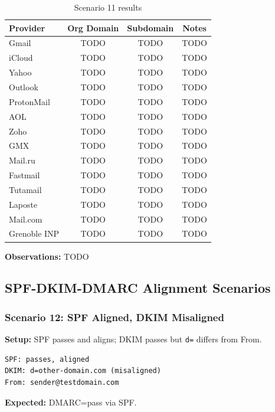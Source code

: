 \documentclass[11pt,a4paper]{article}
\begin{document}
\begin{table}[h]
\centering
\small
\begin{tabular}{lccc}
\toprule
\textbf{Provider} & \textbf{Org Domain} & \textbf{Subdomain} & \textbf{Notes} \\
\midrule
Gmail & TODO & TODO & TODO \\
iCloud & TODO & TODO & TODO \\
Yahoo & TODO & TODO & TODO \\
Outlook & TODO & TODO & TODO \\
ProtonMail & TODO & TODO & TODO \\
AOL & TODO & TODO & TODO \\
Zoho & TODO & TODO & TODO \\
GMX & TODO & TODO & TODO \\
Mail.ru & TODO & TODO & TODO \\
Fastmail & TODO & TODO & TODO \\
Tutamail & TODO & TODO & TODO \\
Laposte & TODO & TODO & TODO \\
Mail.com & TODO & TODO & TODO \\
Grenoble INP & TODO & TODO & TODO \\
\bottomrule
\end{tabular}
\caption{Scenario 11 results}
\end{table}

\textbf{Observations:} TODO

\subsection{SPF-DKIM-DMARC Alignment Scenarios}

\subsubsection{Scenario 12: SPF Aligned, DKIM Misaligned}

\textbf{Setup:} SPF passes and aligns; DKIM passes but \texttt{d=} differs from From.

\begin{lstlisting}
SPF: passes, aligned
DKIM: d=other-domain.com (misaligned)
From: sender@testdomain.com
\end{lstlisting}

\textbf{Expected:} DMARC=pass via SPF.
\end{document}
